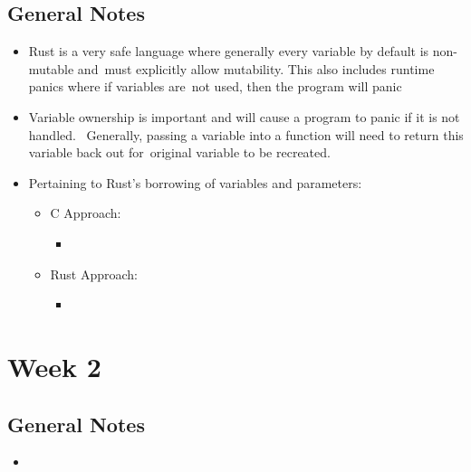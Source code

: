 \documentclass[11pt]{article}
\begin{document}
\subsection{General Notes}
\begin{itemize}
  \item Rust is a very safe language where generally every variable by default is non-mutable and\
    must explicitly allow mutability.  This also includes runtime panics where if variables are\
    not used, then the program will panic
  \item Variable ownership is important and will cause a program to panic if it is not handled.  \
    Generally, passing a variable into a function will need to return this variable back out for\
    original variable to be recreated.
  \item Pertaining to Rust's borrowing of variables and parameters:
  \begin{itemize}
    \item C Approach:
    \begin{itemize}
      \item 
    \end{itemize}
    \item Rust Approach:
    \begin{itemize}
      \item 
    \end{itemize}
  \end{itemize}
\end{itemize}


\newpage
\section{Week 2}

\subsection{General Notes}
\begin{itemize}
  \item 
\end{itemize}

\end{document}

